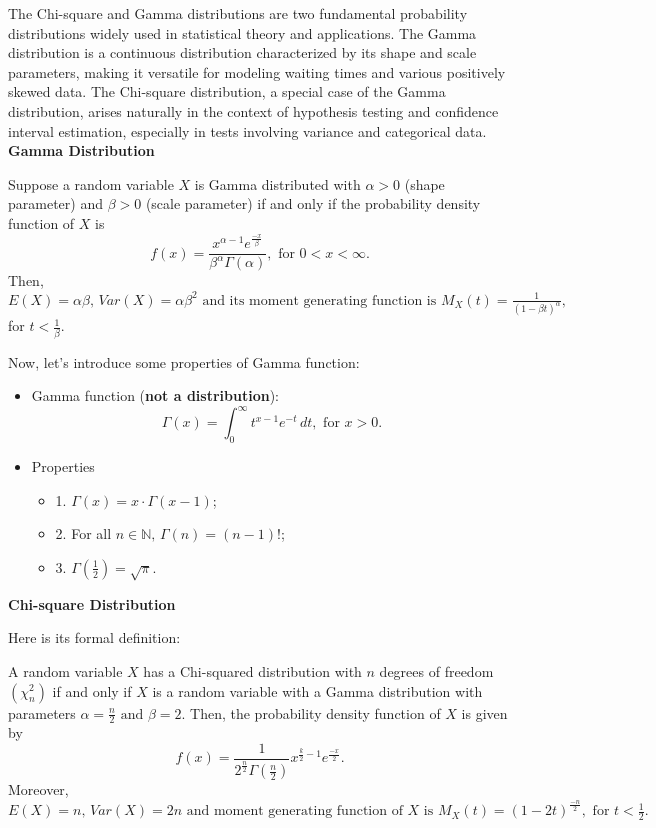The Chi-square and Gamma distributions are two fundamental probability distributions widely used in statistical theory and applications. The Gamma distribution is a continuous distribution characterized by its shape and scale parameters, making it versatile for modeling waiting times and various positively skewed data. The Chi-square distribution, a special case of the Gamma distribution, arises naturally in the context of hypothesis testing and confidence interval estimation, especially in tests involving variance and categorical data.\\

\noindent
\textbf{Gamma Distribution}

\begin{definition}
Suppose a random variable $X$ is Gamma distributed with $\alpha > 0$ (shape parameter) and $\beta > 0$ (scale parameter) if and only if the probability density function of $X$ is \[ f(x) = \frac{x^{\alpha - 1} e^{\frac{-x}{\beta}}}{\beta^{\alpha} \Gamma(\alpha)}, \text{ for $0 < x < \infty.$}\]
Then, $E(X) = \alpha \beta \text{, } Var(X) = \alpha \beta^2 \text{ and its moment generating function is } M_{X}(t) = \frac{1}{(1 - \beta t)^{\alpha}},$ for $t < \frac{1}{\beta}.$
\end{definition}

\noindent
Now, let's introduce some properties of Gamma function:

\begin{itemize}
	\item Gamma function (\textbf{not a distribution}): \[ \Gamma(x) = \int_{0}^{\infty}t^{x-1}e^{-t}\,dt, \text{ for $x > 0$.} \]
	\item Properties
		\begin{itemize}
			\item 1. $\Gamma(x) = x \cdot \Gamma(x-1)$;
			\item 2. For all $n \in \mathbb{N} \text{, } \Gamma(n) = (n - 1)!$; 
			\item 3. $\Gamma(\frac{1}{2}) = \sqrt{\pi}$.
		\end{itemize}
\end{itemize}

\noindent
\textbf{Chi-square Distribution}

\noindent
Here is its formal definition:

\begin{definition}
A random variable $X$ has a Chi-squared distribution with $n$ degrees of freedom $(\chi_{n}^{2})$ if and only if $X$ is a random variable with a Gamma distribution with parameters $\alpha = \frac{n}{2} \text{ and } \beta = 2.$ Then, the probability density function of $X$ is given by \[ f(x) = \frac{1}{2^{\frac{n}{2}} \Gamma(\frac{n}{2})} x^{\frac{k}{2} - 1} e^{\frac{-x}{2}}.\] Moreover, $E(X) = n \text{, } Var(X) = 2n \text{ and moment generating function of $X$ is } M_{X}(t) = (1 - 2t)^{\frac{-n}{2}}, \text{ for $t < \frac{1}{2}$}.$ 
\end{definition}

